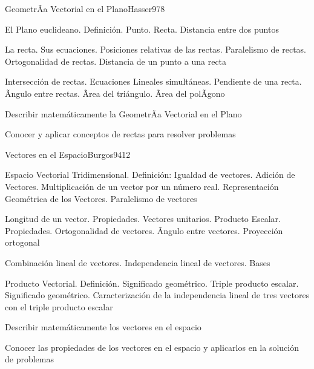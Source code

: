 \begin{syllabus}
\begin{unit}{GeometrÃ­a Vectorial en el Plano}{Hasser97}{8}
\begin{topics}
	\item El Plano euclideano. Definición. Punto. Recta. Distancia entre dos puntos
	\item La recta. Sus ecuaciones. Posiciones relativas de las rectas. Paralelismo de rectas. Ortogonalidad de rectas. Distancia de un punto a una recta
      \item Intersección de rectas. Ecuaciones Lineales simultáneas. Pendiente de una recta. Ãngulo entre rectas. Ãrea del triángulo. Ãrea del polÃ­gono
\end{topics}
   \begin{unitgoals}
      \item Describir matemáticamente la GeometrÃ­a Vectorial en el Plano
      \item Conocer y aplicar conceptos de rectas para resolver problemas
   \end{unitgoals}
\end{unit}

\begin{unit}{Vectores en el Espacio}{Burgos94}{12}
\begin{topics}
      \item Espacio Vectorial Tridimensional. Definición: Igualdad de vectores. Adición de Vectores. Multiplicación de un vector por un número real. Representación Geométrica de los Vectores. Paralelismo de vectores
      \item Longitud de un vector. Propiedades. Vectores unitarios. Producto Escalar. Propiedades. Ortogonalidad de vectores. Ãngulo entre vectores. Proyección ortogonal
      \item Combinación lineal de vectores. Independencia lineal de vectores. Bases
      \item Producto Vectorial. Definición. Significado geométrico. Triple producto escalar. Significado geométrico. Caracterización de la independencia lineal de tres vectores con el triple producto escalar
\end{topics}

   \begin{unitgoals}
      \item Describir matemáticamente los vectores en el espacio
      \item Conocer las propiedades de los vectores en el espacio y aplicarlos en la solución de problemas
   \end{unitgoals}
\end{unit}


\end{syllabus}
